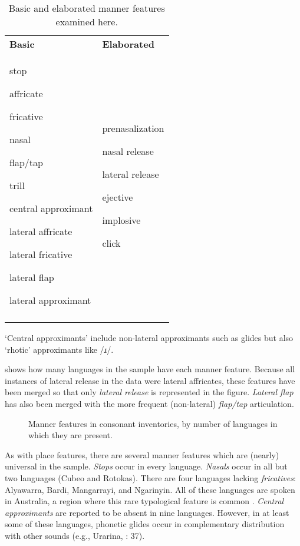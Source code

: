 \begin{table}
\begin{tabularx}{\textwidth}{XX}
\lsptoprule

\textbf{Basic} & \textbf{Elaborated}\\
stop

affricate

fricative

nasal

flap/tap

trill

central approximant

lateral affricate

lateral fricative

lateral flap

lateral approximant & prenasalization

nasal release

lateral release

ejective

implosive

click\\
\lspbottomrule
\end{tabularx}
\caption{\label{tab:4.14}Basic and elaborated manner features examined here.}‘Central approximants’ include non-lateral approximants such as glides but also ‘rhotic’ approximants like /ɹ/.
\end{table}

   shows how many languages in the sample have each manner feature. Because all instances of lateral release in the data were lateral affricates, these features have been merged so that only \textit{lateral release} is represented in the figure. \textit{Lateral flap} has also been merged with the more frequent (non-lateral) \textit{flap/tap} articulation.

  
\begin{figure}
\caption{\label{fig:4.12} Manner features in consonant inventories, by number of languages in which they are present.}
\end{figure}

  As with place features, there are several manner features which are (nearly) universal in the sample. \textit{Stops} occur in every language. \textit{Nasals} occur in all but two languages (Cubeo and Rotokas). There are four languages lacking \textit{fricatives}: Alyawarra, Bardi, Mangarrayi, and Ngarinyin. All of these languages are spoken in Australia, a region where this rare typological feature is common \citep[42]{Maddieson1984}. \textit{Central approximants} are reported to be absent in nine languages. However, in at least some of these languages, phonetic glides occur in complementary distribution with other sounds (e.g., Urarina, \citealt{Olawsky2006}: 37).

